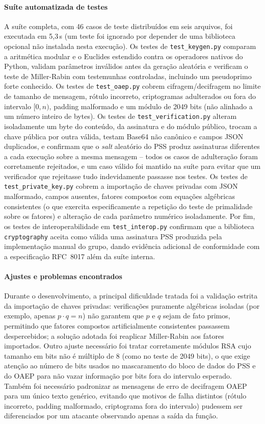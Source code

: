 \documentclass[conference]{IEEEtran}
\begin{document}
\paragraph{Suíte automatizada de testes}
A suíte completa, com 46 casos de teste distribuídos em seis arquivos, foi executada em
5,3\,s (um teste foi ignorado por depender de uma biblioteca opcional não instalada nesta
execução). Os testes de \texttt{test\_keygen.py} comparam a aritmética modular e o Euclides
estendido contra os operadores nativos do Python, validam parâmetros inválidos antes da
geração aleatória e verificam o teste de Miller-Rabin com testemunhas controladas, incluindo um
pseudoprimo forte conhecido. Os testes de \texttt{test\_oaep.py} cobrem cifragem/decifragem no
limite de tamanho de mensagem, rótulo incorreto, criptogramas adulterados ou fora do intervalo
$[0, n)$, padding malformado e um módulo de 2049 bits (não alinhado a um número inteiro de
bytes). Os testes de \texttt{test\_verification.py} alteram isoladamente um byte do conteúdo,
da assinatura e do módulo público, trocam a chave pública por outra válida, testam Base64 não
canônico e campos JSON duplicados, e confirmam que o \textit{salt} aleatório do PSS produz
assinaturas diferentes a cada execução sobre a mesma mensagem -- todos os casos de adulteração
foram corretamente rejeitados, e um caso válido foi mantido na suíte para evitar que um
verificador que rejeitasse tudo indevidamente passasse nos testes. Os testes de
\texttt{test\_private\_key.py} cobrem a importação de chaves privadas com JSON malformado,
campos ausentes, fatores compostos com equações algébricas consistentes (o que exercita
especificamente a repetição do teste de primalidade sobre os fatores) e alteração de cada
parâmetro numérico isoladamente. Por fim, os testes de interoperabilidade em
\texttt{test\_interop.py} confirmam que a biblioteca \texttt{cryptography} aceita como válida
uma assinatura PSS produzida pela implementação manual do grupo, dando evidência adicional de
conformidade com a especificação RFC~8017 além da suíte interna.

\paragraph{Ajustes e problemas encontrados}
Durante o desenvolvimento, a principal dificuldade tratada foi a validação estrita da
importação de chaves privadas: verificações puramente algébricas isoladas (por exemplo, apenas
$p \cdot q = n$) não garantem que $p$ e $q$ sejam de fato primos, permitindo que fatores
compostos artificialmente consistentes passassem despercebidos; a solução adotada foi reaplicar
Miller-Rabin aos fatores importados. Outro ajuste necessário foi tratar corretamente módulos
RSA cujo tamanho em bits não é múltiplo de 8 (como no teste de 2049 bits), o que exige atenção
ao número de bits usados no mascaramento do bloco de dados do PSS e do OAEP para não vazar
informação por bits fora do intervalo esperado. Também foi necessário padronizar as mensagens
de erro de decifragem OAEP para um único texto genérico, evitando que motivos de falha
distintos (rótulo incorreto, padding malformado, criptograma fora do intervalo) pudessem ser
diferenciados por um atacante observando apenas a saída da função.
\end{document}
